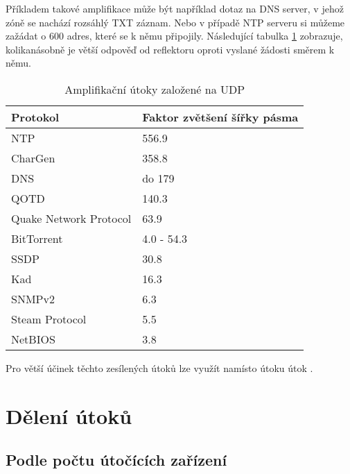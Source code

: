 Příkladem takové amplifikace může být například dotaz na DNS server, v jehož zóně se nachází
rozsáhlý TXT záznam. Nebo v případě NTP serveru si můžeme zažádat o 600 adres, které se k němu
připojily. Následující tabulka \ref{tab:udp_ampl} zobrazuje, kolikanásobně je větší odpověď od
reflektoru oproti vyslané žádosti směrem k němu.

\begin{table}[]
	\centering
	\caption{Amplifikační útoky založené na UDP \cite{TA14-017A}}
	\label{tab:udp_ampl}
	\begin{tabular}{|l|l|}
		\hline
		Protokol               & Faktor zvětšení šířky pásma    \\ \hline
		NTP                    & 556.9                          \\ \hline
		CharGen                & 358.8                          \\ \hline
		DNS                    & do 179                         \\ \hline
		QOTD                   & 140.3                          \\ \hline
		Quake Network Protocol & 63.9                           \\ \hline
		BitTorrent             & 4.0 - 54.3                     \\ \hline
		SSDP                   & 30.8                           \\ \hline
		Kad                    & 16.3                           \\ \hline
		SNMPv2                 & 6.3                            \\ \hline
		Steam Protocol         & 5.5                            \\ \hline
		NetBIOS                & 3.8                            \\ \hline
	\end{tabular}
\end{table}

Pro větší účinek těchto zesílených útoků lze využít namísto  útoku útok .

\section{Dělení útoků}
\subsection{Podle počtu útočících zařízení}

